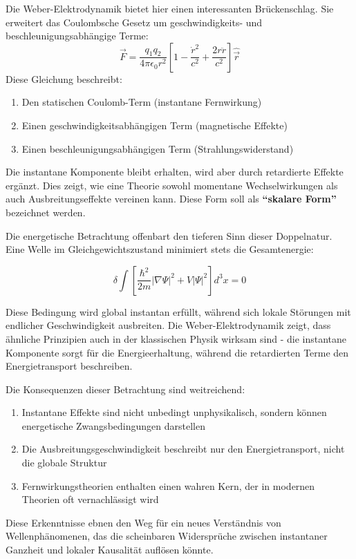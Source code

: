 Die Weber-Elektrodynamik bietet hier einen interessanten Brückenschlag. Sie erweitert das Coulombsche Gesetz um geschwindigkeits- und beschleunigungsabhängige Terme:
\begin{equation}
    \label{eq:weber_em_skalar}
    \vec{F} = \frac{q_1q_2}{4\pi\epsilon_0r^2}\left[1 - \frac{\dot{r}^2}{c^2} + \frac{2r\ddot{r}}{c^2}\right]\hat{\vec{r}}
\end{equation}
Diese Gleichung beschreibt:
\begin{enumerate}
    \item Den statischen Coulomb-Term (instantane Fernwirkung)
    \item Einen geschwindigkeitsabhängigen Term (magnetische Effekte)
    \item Einen beschleunigungsabhängigen Term (Strahlungswiderstand)
\end{enumerate}
Die instantane Komponente bleibt erhalten, wird aber durch retardierte Effekte ergänzt. Dies zeigt, wie eine Theorie sowohl momentane Wechselwirkungen als auch Ausbreitungseffekte vereinen kann.
Diese Form soll als \textbf{\enquote{skalare Form}} bezeichnet werden.

Die energetische Betrachtung offenbart den tieferen Sinn dieser Doppelnatur. Eine Welle im Gleichgewichtszustand minimiert stets die Gesamtenergie:

\begin{equation}
    \delta \int \left[\frac{\hbar^2}{2m}|\nabla\Psi|^2 + V|\Psi|^2\right] d^3x = 0    
\end{equation}

Diese Bedingung wird global instantan erfüllt, während sich lokale Störungen mit endlicher Geschwindigkeit ausbreiten. Die Weber-Elektrodynamik zeigt, dass ähnliche Prinzipien auch in der
klassischen Physik wirksam sind - die instantane Komponente sorgt für die Energieerhaltung, während die retardierten Terme den Energietransport beschreiben.

Die Konsequenzen dieser Betrachtung sind weitreichend:
\begin{enumerate}
    \item Instantane Effekte sind nicht unbedingt unphysikalisch, sondern können energetische Zwangsbedingungen darstellen
    \item Die Ausbreitungsgeschwindigkeit beschreibt nur den Energietransport, nicht die globale Struktur
    \item Fernwirkungstheorien enthalten einen wahren Kern, der in modernen Theorien oft vernachlässigt wird
\end{enumerate}
Diese Erkenntnisse ebnen den Weg für ein neues Verständnis von Wellenphänomenen, das die scheinbaren Widersprüche zwischen instantaner Ganzheit und lokaler Kausalität auflösen könnte.

